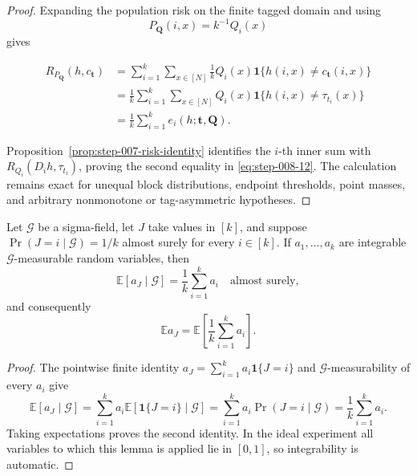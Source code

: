 \begin{proof}
Expanding the population risk on the finite tagged domain and using
\[
P_{\boldsymbol Q}(i,x)=k^{-1}Q_i(x)
\]
gives

\[
\begin{aligned}
R_{P_{\boldsymbol Q}}(h,c_{\boldsymbol t})
&=\sum_{i=1}^k\sum_{x\in[N]}
  \frac1k Q_i(x)
  \mathbf1\{h(i,x)\ne c_{\boldsymbol t}(i,x)\}\\
&=\frac1k\sum_{i=1}^k\sum_{x\in[N]}Q_i(x)
  \mathbf1\{h(i,x)\ne\tau_{t_i}(x)\}\\
&=\frac1k\sum_{i=1}^k e_i(h;\boldsymbol t,\boldsymbol Q).
\end{aligned}
\tag{S8.13}\label{eq:step-008-13}
\]

Proposition~\ref{prop:step-007-risk-identity} identifies the
\(i\)-th inner sum with
\(R_{Q_i}(D_i h,\tau_{t_i})\), proving the second equality in \eqref{eq:step-008-12}. The
calculation remains exact for unequal block distributions, endpoint
thresholds, point masses, and arbitrary nonmonotone or tag-asymmetric
hypotheses. \end{proof}

\begin{lemma}\label{lem:step-008-finite-conditional-average}
Let $\mathcal G$ be a sigma-field, let $J$ take values in $[k]$, and suppose
$\Pr(J=i\mid\mathcal G)=1/k$ almost surely for every $i\in[k]$.  If
$a_1,\ldots,a_k$ are integrable $\mathcal G$-measurable random variables,
then
\[
\mathbb E[a_J\mid\mathcal G]=\frac1k\sum_{i=1}^k a_i
\quad\text{almost surely},
\]
and consequently
\[
\mathbb E a_J=\mathbb E\left[\frac1k\sum_{i=1}^k a_i\right].
\]
\end{lemma}

\begin{proof}
The pointwise finite identity
$a_J=\sum_{i=1}^k a_i\mathbf1\{J=i\}$ and
$\mathcal G$-measurability of every $a_i$ give
\[
\mathbb E[a_J\mid\mathcal G]
=\sum_{i=1}^k a_i\mathbb E[\mathbf1\{J=i\}\mid\mathcal G]
=\sum_{i=1}^k a_i\Pr(J=i\mid\mathcal G)
=\frac1k\sum_{i=1}^k a_i.
\]
Taking expectations proves the second identity.  In the ideal experiment
all variables to which this lemma is applied lie in $[0,1]$, so
integrability is automatic.
\end{proof}

